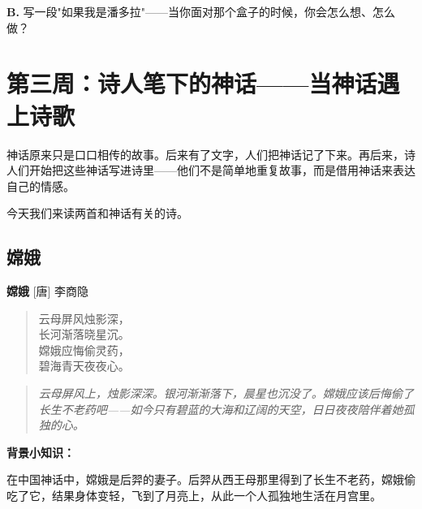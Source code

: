 \documentclass[a4paper,12pt]{ctexart}
\begin{document}
\noindent
\textbf{B.} 写一段"如果我是潘多拉"——当你面对那个盒子的时候，你会怎么想、怎么做？

\newpage

\section*{\textcolor{orange!80!black}{第三周：诗人笔下的神话——当神话遇上诗歌}}

神话原来只是口口相传的故事。后来有了文字，人们把神话记了下来。再后来，诗人们开始把这些神话写进诗里——他们不是简单地重复故事，而是借用神话来表达自己的情感。

今天我们来读两首和神话有关的诗。

\vspace{0.5cm}

\subsection*{\textcolor{teal!80!black}{嫦娥}}

\begin{center}
\large
\textbf{嫦娥} \hspace{2cm} [唐] 李商隐
\end{center}

\begin{quote}
\large
云母屏风烛影深，\\
长河渐落晓星沉。\\
嫦娥应悔偷灵药，\\
碧海青天夜夜心。
\end{quote}

\vspace{0.3cm}

\begin{quote}
\textit{云母屏风上，烛影深深。银河渐渐落下，晨星也沉没了。嫦娥应该后悔偷了长生不老药吧——如今只有碧蓝的大海和辽阔的天空，日日夜夜陪伴着她孤独的心。}
\end{quote}

\vspace{0.3cm}

\textbf{背景小知识：}

在中国神话中，嫦娥是后羿的妻子。后羿从西王母那里得到了长生不老药，嫦娥偷吃了它，结果身体变轻，飞到了月亮上，从此一个人孤独地生活在月宫里。

\vspace{0.3cm}
\end{document}
